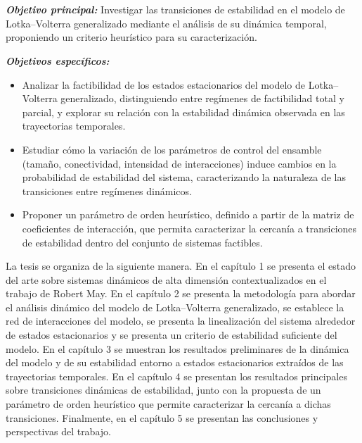 \\
\\
\textbf{\textit{Objetivo principal:}} Investigar las transiciones de estabilidad en el modelo de Lotka--Volterra generalizado mediante el análisis de su dinámica temporal, proponiendo un criterio heurístico para su caracterización.

\textbf{\textit{Objetivos específicos:}}
\begin{itemize}
	\item[1.] Analizar la factibilidad de los estados estacionarios del modelo de Lotka--Volterra generalizado, distinguiendo entre regímenes de factibilidad total y parcial, y explorar su relación con la estabilidad dinámica observada en las trayectorias temporales.
	\item[2.] Estudiar cómo la variación de los parámetros de control del ensamble (tamaño, conectividad, intensidad de interacciones) induce cambios en la probabilidad de estabilidad del sistema, caracterizando la naturaleza de las transiciones entre regímenes dinámicos.
	\item[3.] Proponer un parámetro de orden heurístico, definido a partir de la matriz de coeficientes de interacción, que permita caracterizar la cercanía a transiciones de estabilidad dentro del conjunto de sistemas factibles.
\end{itemize}

La tesis se organiza de la siguiente manera. En el capítulo 1 se presenta el estado del arte sobre sistemas dinámicos de alta dimensión contextualizados en el trabajo de Robert May. En el capítulo 2 se presenta la metodología para abordar el análisis dinámico del modelo de Lotka–Volterra generalizado, se establece la red de interacciones del modelo, se presenta la linealización del sistema alrededor de estados estacionarios y se presenta un criterio de estabilidad suficiente del modelo. En el capítulo 3 se muestran los resultados preliminares de la dinámica del modelo y de su estabilidad entorno a estados estacionarios extraídos de las trayectorias temporales. En el capítulo 4 se presentan los resultados principales sobre transiciones dinámicas de estabilidad, junto con la propuesta de un parámetro de orden heurístico que permite caracterizar la cercanía a dichas transiciones. Finalmente, en el capítulo 5 se presentan las conclusiones y perspectivas del trabajo.

